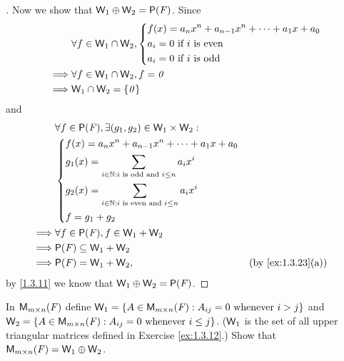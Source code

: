 \begin{proof}[]
  Now we show that \(\W_1 \oplus \W_2 = \ps{\F}\).
  Since
  \begin{align*}
             & \forall f \in \mathsf{W}_1 \cap \mathsf{W}_2, \begin{dcases}
                                               f(x) = a_n x^n + a_{n - 1} x^n + \cdots + a_1 x + a_0 \\
                                               a_i = 0 \text{ if } i \text{ is even}                 \\
                                               a_i = 0 \text{ if } i \text{ is odd}
                                             \end{dcases} \\
    \implies & \forall f \in \mathsf{W}_1 \cap \mathsf{W}_2, f = \mathit{0}                                               \\
    \implies & \mathsf{W}_1 \cap \mathsf{W}_2 = \left\lbrace\mathit{0}\right\rbrace
  \end{align*}
  and
  \begin{align*}
             & \forall f \in \ps{\F}, \exists (g_1, g_2) \in \W_1 \times \W_2 :                                 \\
             & \begin{dcases}
                 f(x) = a_n x^n + a_{n - 1} x^n + \cdots + a_1 x + a_0              \\
                 g_1(x) = \sum_{i \in \N : i \text{ is odd and } i \leq n} a_i x^i  \\
                 g_2(x) = \sum_{i \in \N : i \text{ is even and } i \leq n} a_i x^i \\
                 f = g_1 + g_2
               \end{dcases}                           \\
    \implies & \forall f \in \ps{\F}, f \in \W_1 + \W_2                                                         \\
    \implies & \ps{\F} \subseteq \W_1 + \W_2                                                                    \\
    \implies & \ps{\F} = \W_1 + \W_2,                                                    &  & \by{ex:1.3.23}[a]
  \end{align*}
  by \cref{1.3.11} we know that \(\W_1 \oplus \W_2 = \ps{\F}\).
\end{proof}

\begin{ex}\label{ex:1.3.26}
  In \(\ms\) define \(\W_1 = \set{A \in \ms : A_{i j} = 0 \text{ whenever } i > j}\) and \(\W_2 = \set{A \in \ms : A_{i j} = 0 \text{ whenever } i \leq j}\).
  (\(\mathsf{W}_1\) is the set of all upper triangular matrices defined in Exercise \cref{ex:1.3.12}.)
  Show that \(\ms = \W_1 \oplus \W_2\).
\end{ex}

